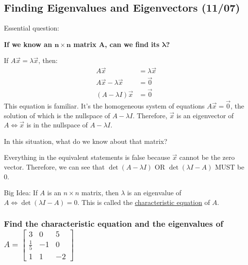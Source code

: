 \documentclass[
  letterpaper,
  DIV=11,
  numbers=noendperiod]{scrartcl}
\begin{document}
\hypertarget{finding-eigenvalues-and-eigenvectors-1107}{%
\subsection{Finding Eigenvalues and Eigenvectors
(11/07)}\label{finding-eigenvalues-and-eigenvectors-1107}}

Essential question:

\textbf{If we know an \(\symbf{n \times n}\) matrix \(\symbf{A}\), can
we find its \(\symbf{\lambda}\)?}

If \(A\vec{x} = \lambda\vec{x}\), then: \begin{align*}
A\vec{x} &= \lambda\vec{x} \\
A\vec{x} - \lambda\vec{x} &= \vec{0} \\
(A-\lambda I)\vec{x} &= \vec{0}
\end{align*} This equation is familiar. It's the homogeneous system of
equations \(A\vec{x} = \vec{0}\), the solution of which is the nullspace
of \(A-\lambda I\). Therefore, \(\vec{x}\) is an eigenvector of
\(A \iff \vec{x}\) is in the nullspace of \(A-\lambda I\).

In this situation, what do we know about that matrix?

Everything in the equivalent statements is false because \(\vec{x}\)
cannot be the zero vector. Therefore, we can see that
\(\det(A-\lambda I)\) OR \(\det(\lambda I-A)\) MUST be 0.

Big Idea: If \(A\) is an \(n \times n\) matrix, then \(\lambda\) is an
eigenvalue of \(A \iff \det(\lambda I-A) = 0\). This is called the
\ul{characteristic equation} of \(A\).

\hypertarget{find-the-characteristic-equation-and-the-eigenvalues-of-abeginbmatrix3-0-5-frac15--1-0-1-1--2endbmatrix}{%
\subsubsection{\texorpdfstring{Find the characteristic equation and the
eigenvalues of
\(A=\begin{bmatrix}3 & 0 & 5\\ \frac{1}{5} & -1 & 0 \\ 1 & 1 & -2\end{bmatrix}\)}{Find the characteristic equation and the eigenvalues of A=\textbackslash begin\{bmatrix\}3 \& 0 \& 5\textbackslash\textbackslash{} \textbackslash frac\{1\}\{5\} \& -1 \& 0 \textbackslash\textbackslash{} 1 \& 1 \& -2\textbackslash end\{bmatrix\}}}\label{find-the-characteristic-equation-and-the-eigenvalues-of-abeginbmatrix3-0-5-frac15--1-0-1-1--2endbmatrix}}
\end{document}
